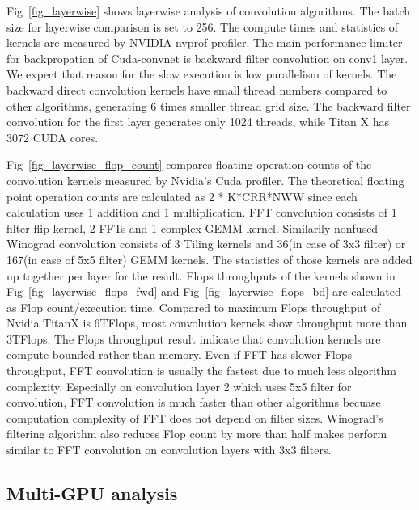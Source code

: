 Fig~\ref{fig_layerwise} shows layerwise analysis of convolution algorithms.
The batch size for layerwise comparison is set to 256.
The compute times and statistics of kernels are measured by NVIDIA nvprof profiler.
The main performance limiter for backpropation of Cuda-convnet is backward filter convolution on conv1 layer.
We expect that reason for the slow execution is low parallelism of kernels.
The backward direct convolution kernels have small thread numbers compared to other algorithms, generating 6 times smaller thread grid size.
The backward filter convolution for the first layer generates only 1024 threads, while Titan X has 3072 CUDA cores.

Fig~\ref{fig_layerwise_flop_count} compares floating operation counts of the convolution kernels measured by Nvidia's Cuda profiler.
The theoretical floating point operation counts are calculated as 2 * K*CRR*NWW since each calculation uses 1 addition and 1 multiplication.
FFT convolution consists of 1 filter flip kernel, 2 FFTs and 1 complex GEMM kernel.
Similarily nonfused Winograd convolution consists of 3 Tiling kernels and 36(in case of 3x3 filter) or 167(in case of 5x5 filter) GEMM kernels.
The statistics of those kernels are added up together per layer for the result.
Flops throughputs of the kernels shown in Fig~\ref{fig_layerwise_flops_fwd} and Fig~\ref{fig_layerwise_flops_bd} are calculated as Flop count/execution time.
Compared to maximum Flops throughput of Nvidia TitanX is 6TFlops, most convolution kernels show throughput more than 3TFlops.
The Flops throughput result indicate that convolution kernels are compute bounded rather than memory.
Even if FFT has slower Flops throughput, FFT convolution is usually the fastest due to much less algorithm complexity.
Especially on convolution layer 2 which uses 5x5 filter for convolution, FFT convolution is much faster than other algorithms becuase computation complexity of FFT does not depend on filter sizes.
Winograd's filtering algorithm also reduces Flop count by more than half makes perform similar to FFT convolution on convolution layers with 3x3 filters.

\subsection{Multi-GPU analysis}

